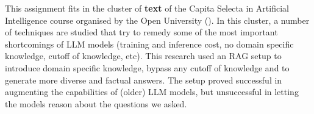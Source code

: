 \documentclass[]{article}
\begin{document}
This assignment fits in the cluster of \textbf{text} of the Capita Selecta in Artificial Intelligence course organised by the Open University (\cite{ou}).
In this cluster, a number of techniques are studied that try to remedy some of the most important shortcomings of LLM models (training and inference cost, no domain specific knowledge, cutoff of knowledge, etc).
This research used an RAG setup to introduce domain specific knowledge, bypass any cutoff of knowledge and to generate more diverse and factual answers.
The setup proved successful in augmenting the capabilities of (older) LLM models, but unsuccessful in letting the models reason about the questions we asked.

\printbibliography
\end{document}
